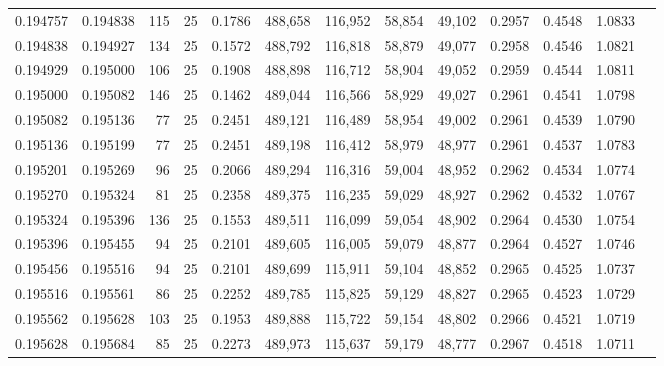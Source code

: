 \begin{tabular}{rrrrrrrrrrrrr}
0.194757 & 0.194838 &   115 &  25 &                                     0.1786 & 488,658 & 116,952 &  58,854 &  49,102 & 0.2957 & 0.4548 & 1.0833 \\
0.194838 & 0.194927 &   134 &  25 &                                     0.1572 & 488,792 & 116,818 &  58,879 &  49,077 & 0.2958 & 0.4546 & 1.0821 \\
0.194929 & 0.195000 &   106 &  25 &                                     0.1908 & 488,898 & 116,712 &  58,904 &  49,052 & 0.2959 & 0.4544 & 1.0811 \\
0.195000 & 0.195082 &   146 &  25 &                                     0.1462 & 489,044 & 116,566 &  58,929 &  49,027 & 0.2961 & 0.4541 & 1.0798 \\
0.195082 & 0.195136 &    77 &  25 &                                     0.2451 & 489,121 & 116,489 &  58,954 &  49,002 & 0.2961 & 0.4539 & 1.0790 \\
0.195136 & 0.195199 &    77 &  25 &                                     0.2451 & 489,198 & 116,412 &  58,979 &  48,977 & 0.2961 & 0.4537 & 1.0783 \\
0.195201 & 0.195269 &    96 &  25 &                                     0.2066 & 489,294 & 116,316 &  59,004 &  48,952 & 0.2962 & 0.4534 & 1.0774 \\
0.195270 & 0.195324 &    81 &  25 &                                     0.2358 & 489,375 & 116,235 &  59,029 &  48,927 & 0.2962 & 0.4532 & 1.0767 \\
0.195324 & 0.195396 &   136 &  25 &                                     0.1553 & 489,511 & 116,099 &  59,054 &  48,902 & 0.2964 & 0.4530 & 1.0754 \\
0.195396 & 0.195455 &    94 &  25 &                                     0.2101 & 489,605 & 116,005 &  59,079 &  48,877 & 0.2964 & 0.4527 & 1.0746 \\
0.195456 & 0.195516 &    94 &  25 &                                     0.2101 & 489,699 & 115,911 &  59,104 &  48,852 & 0.2965 & 0.4525 & 1.0737 \\
0.195516 & 0.195561 &    86 &  25 &                                     0.2252 & 489,785 & 115,825 &  59,129 &  48,827 & 0.2965 & 0.4523 & 1.0729 \\
0.195562 & 0.195628 &   103 &  25 &                                     0.1953 & 489,888 & 115,722 &  59,154 &  48,802 & 0.2966 & 0.4521 & 1.0719 \\
0.195628 & 0.195684 &    85 &  25 &                                     0.2273 & 489,973 & 115,637 &  59,179 &  48,777 & 0.2967 & 0.4518 & 1.0711 \\

\end{tabular}
